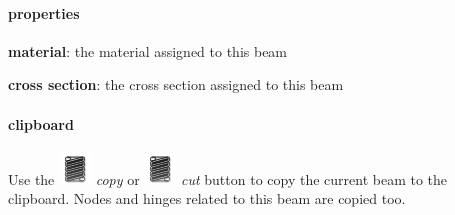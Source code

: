 \documentclass[a4paper,11pt]{report}
\begin{document}
\paragraph{properties}
\begin{trivlist}
	\leftskip=1cm
	\item[]\textbf{material}: the material assigned to this beam
	\item[]\textbf{cross section}: the cross section assigned to this beam
\end{trivlist}

\paragraph{clipboard}
Use the \includegraphics[scale=0.5]{../../icons/spring.png} \textit{copy} or \includegraphics[scale=0.5]{../../icons/spring.png} \textit{cut} button to copy the current beam to the clipboard. Nodes and hinges related to this beam are copied too.
\end{document}
